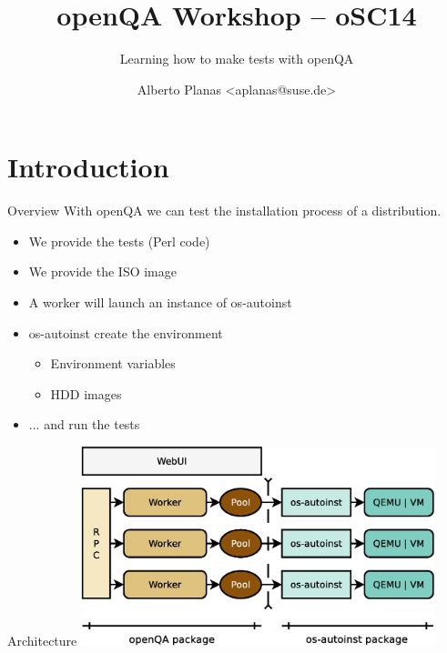 \documentclass{beamer}
\author{Alberto Planas <aplanas@suse.de>\newline {\small openSUSE Team}}
\title{openQA Workshop -- oSC14}
\subtitle{Learning how to make tests with openQA}
\begin{document}
\begin{frame}[t,plain]
  \titlepage
\end{frame}


\section{Introduction}
%
%
\begin{frame}{Overview}
  With openQA we can test the installation process of a distribution.
  \begin{itemize}
  \item We provide the tests (Perl code)
  \item We provide the ISO image
  \item A worker will launch an instance of os-autoinst
  \item os-autoinst create the environment
    \begin{itemize}
    \item Environment variables
    \item HDD images
    \end{itemize}
  \item ... and run the tests
  \end{itemize}
\end{frame}

%
%
\begin{frame}{Architecture}
  \includegraphics[height=5.8cm,width=10.3cm]{arch}
\end{frame}
\end{document}
